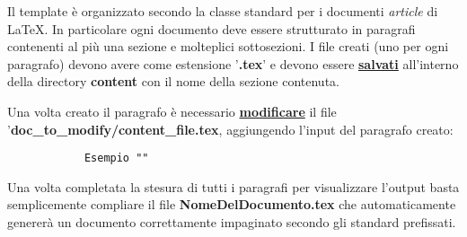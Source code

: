 \documentclass[10pt]{article}
\begin{document}
	Il template è organizzato secondo la classe standard per i documenti \textit{article} di \LaTeX.
	In particolare ogni documento deve essere strutturato in paragrafi contenenti al più una sezione e molteplici sottosezioni.
	I file creati (uno per ogni paragrafo) devono avere come estensione '\textbf{.tex}' e devono essere \underline{\textbf{salvati}} all'interno della directory \textbf{content} con il nome della sezione contenuta.
	
	Una volta creato il paragrafo è necessario \underline{\textbf{modificare}} il file '\textbf{doc\_to\_modify/content\_file.tex}, aggiungendo l'input del paragrafo creato: \begin{center}\begin{verbatim}
			Esempio	""
		\end{verbatim}\end{center}
		
		Una volta completata la stesura di tutti i paragrafi per visualizzare l'output basta semplicemente compliare il file \textbf{NomeDelDocumento.tex} che automaticamente genererà un documento correttamente impaginato secondo gli standard prefissati.
	
\end{document}
